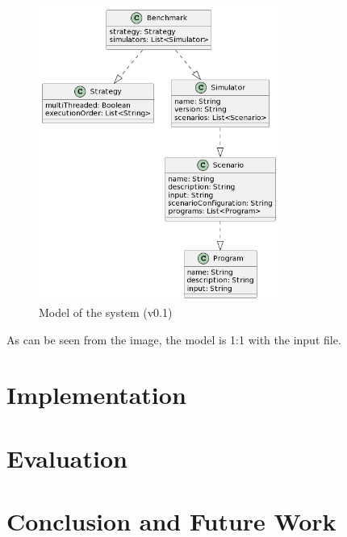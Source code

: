 \documentclass[12pt,a4paper,openright,twoside]{book}
\begin{document}
\begin{figure}[h]
  \centering
  \includegraphics[width=0.7\textwidth]{figures/model.png}
  \caption{Model of the system (v0.1)}
  \label{fig:model}
\end{figure}

As can be seen from the image, the model is 1:1 with the input file.

\chapter{Implementation}

\chapter{Evaluation}

\chapter{Conclusion and Future Work}


\backmatter




\end{document}
